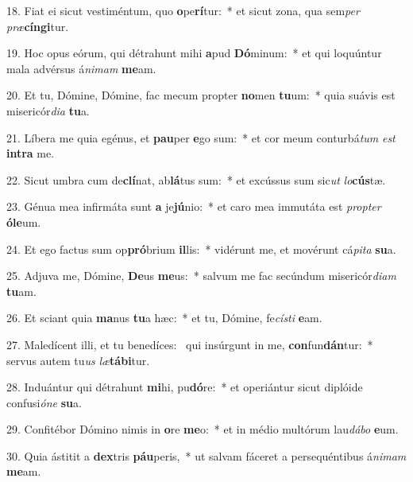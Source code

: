 18. Fiat ei sicut vestiméntum, quo \textbf{o}pe\textbf{rí}tur:~*  et sicut zona, qua sem\textit{per} \textit{præ}\textbf{cín}\textbf{gi}tur.\

19. Hoc opus eórum, qui détrahunt mihi \textbf{a}pud \textbf{Dó}minum:~*  et qui loquúntur mala advérsus á\textit{ni}\textit{mam} \textbf{me}am.\

20. Et tu, Dómine, Dómine, fac mecum propter \textbf{no}men \textbf{tu}um:~*  quia suávis est misericór\textit{di}\textit{a} \textbf{tu}a.\

21. Líbera me quia egénus, et \textbf{pau}per \textbf{e}go sum:~*  et cor meum conturbá\textit{tum} \textit{est} \textbf{in}\textbf{tra} me.\

22. Sicut umbra cum de\textbf{clí}nat, ab\textbf{lá}tus sum:~*  et excússus sum sic\textit{ut} \textit{lo}\textbf{cús}tæ.\

23. Génua mea infirmáta sunt \textbf{a} je\textbf{jú}nio:~*  et caro mea immutáta est \textit{prop}\textit{ter} \textbf{ó}\textbf{le}um.\

24. Et ego factus sum op\textbf{pró}brium \textbf{il}lis:~*  vidérunt me, et movérunt cá\textit{pi}\textit{ta} \textbf{su}a.\

25. Adjuva me, Dómine, \textbf{De}us \textbf{me}us:~*  salvum me fac secúndum misericór\textit{di}\textit{am} \textbf{tu}am.\

26. Et sciant quia \textbf{ma}nus \textbf{tu}a hæc:~*  et tu, Dómine, fe\textit{cís}\textit{ti} \textbf{e}am.\

27. Maledícent illi, et tu benedíces: \dag\  qui insúrgunt in me, \textbf{con}fun\textbf{dán}tur:~*  servus autem tu\textit{us} \textit{læ}\textbf{tá}\textbf{bi}tur.\

28. Induántur qui détrahunt \textbf{mi}hi, pu\textbf{dó}re:~*  et operiántur sicut diplóide confusi\textit{ó}\textit{ne} \textbf{su}a.\

29. Confitébor Dómino nimis in \textbf{o}re \textbf{me}o:~*  et in médio multórum lau\textit{dá}\textit{bo} \textbf{e}um.\

30. Quia ástitit a \textbf{dex}tris \textbf{páu}peris,~*  ut salvam fáceret a persequéntibus á\textit{ni}\textit{mam} \textbf{me}am.\

